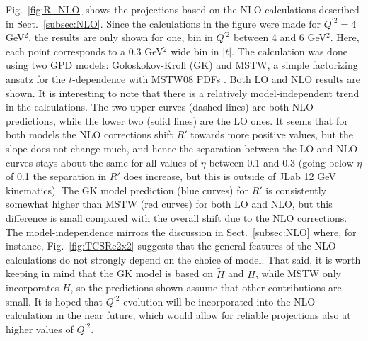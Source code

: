 Fig.~\ref{fig:R_NLO} shows the projections based on the NLO calculations
described in Sect.~\ref{subsec:NLO}. Since the calculations in the figure
were made for $Q^{\prime 2} = 4$ GeV$^2$, the results are only shown for
one, bin in $Q^{\prime 2}$ between 4 and 6 GeV$^2$. Here, each point
corresponds to a 0.3 GeV$^2$ wide bin in $|t|$. 
The calculation was done using two GPD models: Goloskokov-Kroll (GK)
\cite{Goloskokov:2005sd,Goloskokov:2006hr,Goloskokov:2007nt,Kroll:2012sm}
and MSTW, a simple factorizing ansatz for the $t$-dependence
\cite{Berger:2001xd} with MSTW08 PDFs \cite{Martin:2009iq}.
Both LO and NLO results are shown. It is interesting to note that there is a
relatively model-independent trend in the calculations. The two upper curves
(dashed lines) are both NLO predictions, while the lower two (solid lines)
are the LO ones. It seems that for both models the NLO corrections shift
$R'$ towards more positive values, but the slope does not change much, and
hence the separation between the LO and NLO curves stays about the same for
all values of $\eta$ between 0.1 and 0.3 (going below $\eta$ of 0.1 the
separation in $R'$ does increase, but this is outside of JLab 12 GeV
kinematics). The GK model prediction (blue curves) for $R'$ is consistently
somewhat higher than MSTW (red curves) for both LO and NLO, but this
difference is small compared with the overall shift due to the NLO
corrections.
The model-independence mirrors the discussion in Sect.~\ref{subsec:NLO} where,
for instance, Fig.~\ref{fig:TCSRe2x2} suggests that the general features of
the NLO calculations do not strongly depend on the choice of model. That said,
it is worth keeping in mind that the GK model is based on $\tilde{H}$ and $H$,
while MSTW only incorporates $H$, so the predictions shown assume that other
contributions are small. It is hoped that $Q^{\prime 2}$ evolution will
be incorporated into the NLO calculation in the near future, which would
allow for reliable projections also at higher values of $Q^{\prime 2}$.

